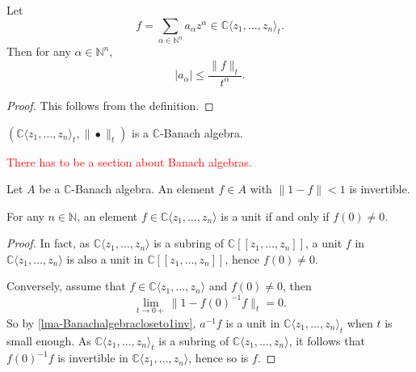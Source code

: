 \begin{proposition}
    Let 
    \[
        f=\sum_{\alpha\in \mathbb{N}^n} a_{\alpha}z^{\alpha}\in  \mathbb{C}\langle z_1,\ldots,z_n\rangle_t. 
    \]
    Then for any $\alpha \in \mathbb{N}^n$,
    \[
      |a_{\alpha}|\leq  \frac{\|f\|_t}{t^{\alpha}}.
    \]
\end{proposition}
\begin{proof}
    This follows from the definition.
\end{proof}

\begin{proposition}\label{prop-CzztBanachalg}
    $(\mathbb{C}\langle z_1,\ldots,z_n\rangle_t,\|\bullet\|_t)$ is a $\mathbb{C}$-Banach algebra.
\end{proposition}

\textcolor{red}{There has to be a section about Banach algebras.}
\begin{lemma}\label{lma-Banachalgebracloseto1inv}
    Let $A$ be a $\mathbb{C}$-Banach algebra. An element $f\in A$ with $\|1-f\|<1$ is invertible.
\end{lemma}

\begin{lemma}\label{lma-unitsinconvpowerseries}
    For any $n\in \mathbb{N}$, an element $f\in \mathbb{C}\langle z_1,\ldots,z_n \rangle$ is a unit if and only if $f(0)\neq 0$.
\end{lemma}
\begin{proof}
    In fact, as $\mathbb{C}\langle z_1,\ldots,z_n \rangle$ is a subring of $\mathbb{C}[[z_1,\ldots,z_n]]$, a unit $f$ in $\mathbb{C}\langle z_1,\ldots,z_n \rangle$ is also a unit in $\mathbb{C}[[z_1,\ldots,z_n]]$, hence $f(0)\neq 0$.

    Conversely, assume that $f\in \mathbb{C}\langle z_1,\ldots,z_n \rangle$ and $f(0)\neq 0$, then
    \[
        \lim_{t\to 0+}\|1-f(0)^{-1}f\|_t=0.
    \]
    So by \cref{lma-Banachalgebracloseto1inv}, $a^{-1}f$ is a unit in $\mathbb{C}\langle z_1,\ldots,z_n \rangle_t$ when $t$ is small enough. As $\mathbb{C}\langle z_1,\ldots,z_n \rangle_t$ is a subring of $\mathbb{C}\langle z_1,\ldots,z_n \rangle$, it follows that $f(0)^{-1}f$ is invertible in $\mathbb{C}\langle z_1,\ldots,z_n \rangle$, hence so is $f$.
\end{proof}



